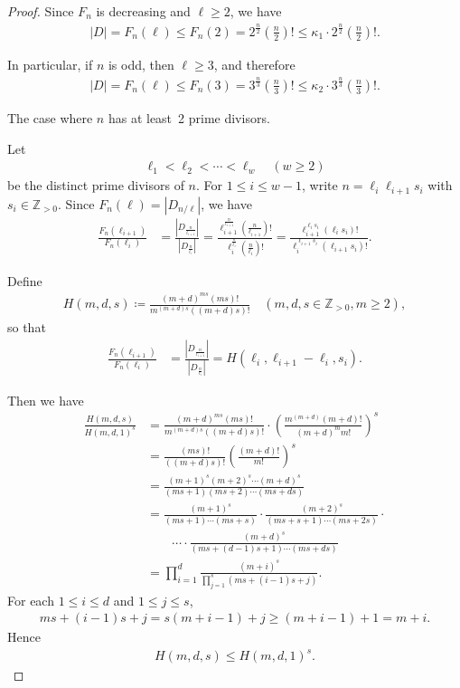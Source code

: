 \documentclass[12pt,reqno]{amsart}
\newcommand{\Zp}{\mathbb{Z}_{> 0}}						%
\newcommand{\q}{\quad}									%
\newcommand{\f}[2]{\frac{#1}{#2}}							%
\newcommand{\ceq}{\coloneqq} 							%
\newcommand{\vt}[1]{\left\lvert #1 \right\rvert}					%
\theoremstyle{mythmstyle}
\theoremstyle{mydefstyle}
\numberwithin{equation}{section}
\begin{document}
\begin{proof}
Since $F_n$ is decreasing and $\ell \ge 2$, we have
\begin{align}
\vt{D} = F_{n}(\ell) \le F_{n}(2) = 2^{\f{n}{2}}\left(\f{n}{2}\right)! \le  \kappa_{1}\cdot2^{\f{n}{2}}\left(\f{n}{2}\right)!.
\end{align}

In particular, if $n$ is odd, then $\ell \ge 3$, and therefore
\begin{align}
\vt{D} = F_{n}(\ell) \le F_{n}(3) = 3^{\f{n}{3}}\left(\f{n}{3}\right)! \le \kappa_{2}\cdot3^{\f{n}{3}}\left(\f{n}{3}\right)!.
\end{align}

\item[(ii)] The case where $n$ has at least~2 prime divisors.

Let
\begin{align}
\ell_1<\ell_2<\cdots<\ell_w \q (w \ge 2)
\end{align}
be the distinct prime divisors of $n$.
For $1 \le i \le w-1$, write $n = \ell_{i}\ell_{i+1}s_{i}$ with $s_{i} \in \Zp$.
Since $F_{n}(\ell)=\vt{D_{n/\ell}}$, we have
\begin{align}
\f{F_{n}(\ell_{i+1})}{F_{n}(\ell_{i})} &= \f{\vt{D_{\f{n}{\ell_{i+1}}}}}{\vt{D_{\f{n}{\ell_{i}}}}}
= \f{\ell_{i+1}^{\f{n}{\ell_{i+1}}}\left(\f{n}{\ell_{i+1}}\right)!}{\ell_{i}^{\f{n}{\ell_{i}}}\left(\f{n}{\ell_{i}}\right)!}
= \f{\ell_{i+1}^{\ell_{i}s_{i}}(\ell_{i}s_{i})!}{\ell_{i}^{\ell_{i+1}s_{i}}(\ell_{i+1}s_{i})!}.
\end{align}

Define
\begin{align}
H(m, d, s) \ceq \f{(m+d)^{ms}(ms)!}{m^{(m+d)s}((m+d)s)!}\q (m, d, s \in \Zp, m \ge 2),
\end{align}
so that
\begin{align}
\f{F_{n}(\ell_{i+1})}{F_{n}(\ell_{i})} &= \f{\vt{D_{\f{n}{\ell_{i+1}}}}}{\vt{D_{\f{n}{\ell_{i}}}}} = H(\ell_{i}, \ell_{i+1}-\ell_{i}, s_{i}).
\end{align}

Then we have
\begin{align}
\f{H(m, d, s)}{H(m, d, 1)^{s}} &= \f{(m+d)^{ms}(ms)!}{m^{(m+d)s}((m+d)s)!}\cdot\left(\f{m^{(m+d)}(m+d)!}{(m+d)^{m}m!}\right)^{s} \\
&= \f{(ms)!}{((m+d)s)!}\left(\f{(m+d)!}{m!}\right)^{s} \\
&= \f{(m+1)^{s}(m+2)^{s}\cdots(m+d)^{s}}{(ms+1)(ms+2)\cdots(ms+ds)} \\
&= \f{(m+1)^{s}}{(ms+1)\cdots(ms+s)}\cdot\f{(m+2)^{s}}{(ms+s+1)\cdots(ms+2s)}\cdot \\
&\qquad \cdots\cdot\f{(m+d)^{s}}{(ms+(d-1)s+1)\cdots(ms+ds)} \\
&= \prod_{i=1}^{d}\f{(m+i)^{s}}{\prod_{j=1}^{s}(ms+(i-1)s+j)}.
\end{align}
For each $1\le i\le d$ and $1\le j\le s$,
\begin{align}
ms+(i-1)s+j = s(m+i-1)+j \ge (m+i-1)+1 = m+i.
\end{align}
Hence
\begin{align}
\label{eq:Hmds1}
H(m, d, s) \le H(m, d, 1)^{s}.
\end{align}


\end{proof}
\end{document}
